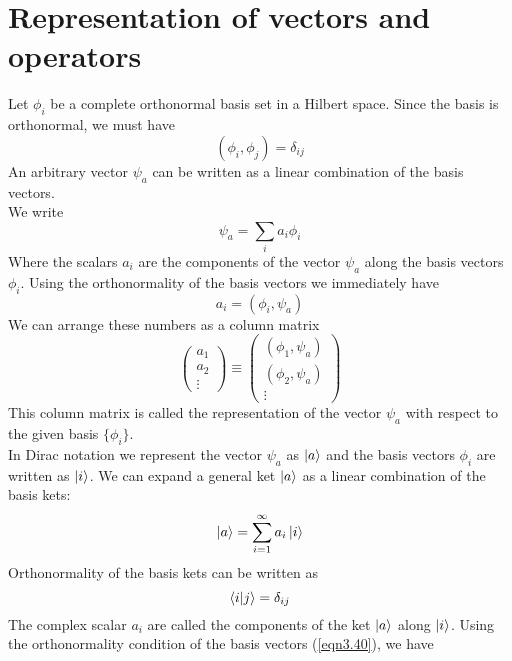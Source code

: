 \section{Representation of vectors and operators}
Let ${\phi_i}$ be a complete orthonormal basis set in a Hilbert space. Since the basis is orthonormal, we must have
\begin{equation}\label{eqn3.36}
(\phi_i,\phi_j) = \delta_{ij}
\end{equation}
An arbitrary vector $\psi_a$ can be written as a linear combination of the basis vectors.\\
We write
\begin{equation}\label{eqn3.37}
\psi_a = \sum_{i} a_i\phi_i
\end{equation}
Where the scalars $a_i$ are the components of the vector $\psi_a$ along the basis vectors $\phi_i$. Using the orthonormality of the basis vectors we immediately have
\begin{equation}\label{eqn3.38}
a_i = (\phi_i, \psi_a)
\end{equation}
We can arrange these numbers as a column matrix
\begin{equation}\label{eqn3.39}
\left(
\begin{matrix}
a_1 \\ a_2 \\ \vdots
\end{matrix}
\right) \equiv \left(
\begin{matrix}
(\phi_1, \psi_a) \\
(\phi_2, \psi_a) \\
\vdots
\end{matrix}
\right)
\end{equation}
This column matrix is called the representation of the vector $\psi_a$ with respect to the given basis $\{\phi_i \}$.\\
In Dirac notation we represent the vector $\psi_a$ as $\ket{a}$ and the basis vectors $\phi_i$ are written as $\ket{i}$. We can expand a general ket $\ket{a}$ as a linear combination of the basis kets:
\begin{equation}\label{eqn3.40}
\ket{a} = \sum_{i=1}^{\infty} a_i \ket{i}
\end{equation}
Orthonormality of the basis kets can be written as
\begin{equation}\label{eqn3.41}
\braket{i}{j} = \delta_{ij}
\end{equation}
The complex scalar $a_i$ are called the components of the ket $\ket{a}$ along $\ket{i}$. Using the orthonormality condition of the basis vectors (\ref{eqn3.40}), we have 
